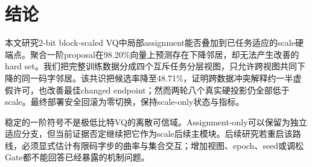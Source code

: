 \section{结论}

本文研究2-bit block-scaled VQ中局部assignment能否叠加到已任务适应的scale硬端点。聚合一阶proposal在98.20\%向量上预测存在下降邻居，却无法产生改善的hard set。我们把完整训练数据分成四个互斥任务分层视图，只允许跨视图共同下降的同一码字邻居。该共识把候选率降至48.71\%，证明跨数据冲突解释约一半虚假许可，也改善最佳changed endpoint；然而两轮八个真实硬投影仍全部低于scale。最终部署安全回滚为零切换，保持scale-only状态与指标。

稳定的一阶符号不是极低比特VQ的离散可信域。Assignment-only可以保留为独立适应分支，但当前证据否定继续把它作为scale后续主模块。后续研究若重启该路线，必须显式估计有限码字步的曲率与集合交互；增加视图、epoch、seed或调松Gate都不能回答已经暴露的机制问题。
